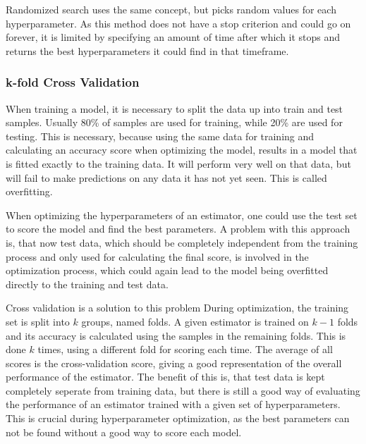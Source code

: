 Randomized search uses the same concept, but picks random values for each hyperparameter.
As this method does not have a stop criterion and could go on forever, it is limited by specifying
an amount of time after which it stops and returns the best hyperparameters it could find in
that timeframe.

\subsubsection{k-fold Cross Validation}

When training a model, it is necessary to split the data up into train and test samples.
Usually 80\% of samples are used for training, while 20\% are used for testing.
This is necessary, because using the same data for training and calculating an accuracy
score when optimizing the model, results in a model that is fitted exactly to the training
data. It will perform very well on that data, but will fail to make predictions on any data
it has not yet seen. This is called overfitting.

When optimizing the hyperparameters of an estimator, one could use the test set to score
the model and find the best parameters. A problem with this approach is, that now test data,
which should be completely independent from the training process and only used for calculating
the final score, is involved in the optimization process, which could again lead to the model being
overfitted directly to the training and test data.

Cross validation is a solution to this problem During optimization, the training set is
split into $k$ groups, named folds. A given estimator is trained on $k-1$ folds and its accuracy
is calculated using the samples in the remaining folds. This is done $k$ times, using a different fold
for scoring each time. The average of all scores is the cross-validation score, giving a good
representation of the overall performance of the estimator.
The benefit of this is, that test data is kept completely seperate from training data, but there
is still a good way of evaluating the performance of an estimator trained with a given set
of hyperparameters. This is crucial during hyperparameter optimization, as the best parameters
can not be found without a good way to score each model.




